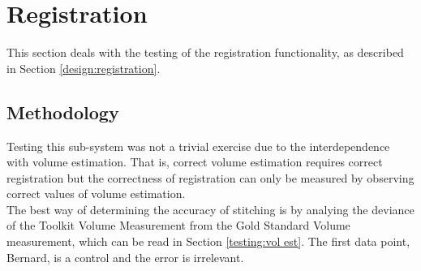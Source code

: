 \section{Registration}
\label{testing:registration}
This section deals with the testing of the registration functionality, as described in Section \ref{design:registration}. 

\subsection{Methodology}
Testing this sub-system was not a trivial exercise due to the interdependence with volume estimation. That is, correct volume estimation requires correct registration but the correctness of registration can only be measured by observing correct values of volume estimation.\\

The best way of determining the accuracy of stitching is by analying the deviance of the Toolkit Volume Measurement from the Gold Standard Volume measurement, which can be read in Section \ref{testing:vol est}. The first data point, Bernard, is a control and the error is irrelevant. \\
